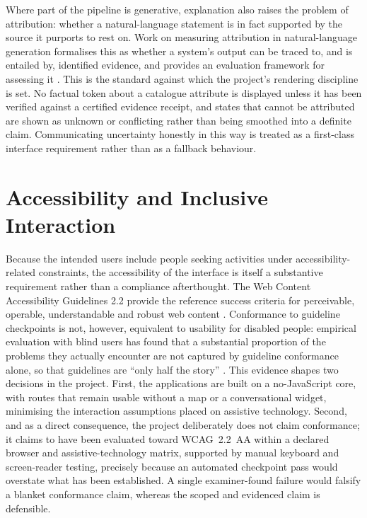 Where part of the pipeline is generative, explanation also raises the problem of attribution: whether
a natural-language statement is in fact supported by the source it purports to rest on. Work on
measuring attribution in natural-language generation formalises this as whether a system's output can
be traced to, and is entailed by, identified evidence, and provides an evaluation framework for
assessing it \cite{rashkin2023attribution}. This is the standard against which the project's rendering
discipline is set. No factual token about a catalogue attribute is displayed unless it has been
verified against a certified evidence receipt, and states that cannot be attributed are shown as
unknown or conflicting rather than being smoothed into a definite claim. Communicating uncertainty
honestly in this way is treated as a first-class interface requirement rather than as a fallback
behaviour.

\section{Accessibility and Inclusive Interaction}
\label{sec:accessibility}
Because the intended users include people seeking activities under accessibility-related constraints,
the accessibility of the interface is itself a substantive requirement rather than a compliance
afterthought. The Web Content Accessibility Guidelines 2.2 provide the reference success criteria for
perceivable, operable, understandable and robust web content \cite{w3c2023wcag22}. Conformance to
guideline checkpoints is not, however, equivalent to usability for disabled people: empirical
evaluation with blind users has found that a substantial proportion of the problems they actually
encounter are not captured by guideline conformance alone, so that guidelines are ``only half the
story'' \cite{power2012guidelines}. This evidence shapes two decisions in the project. First, the
applications are built on a no-JavaScript core, with routes that remain usable without a map or a
conversational widget, minimising the interaction assumptions placed on assistive technology. Second,
and as a direct consequence, the project deliberately does not claim conformance; it claims to have
been evaluated toward WCAG~2.2~AA within a declared browser and assistive-technology matrix, supported
by manual keyboard and screen-reader testing, precisely because an automated checkpoint pass would
overstate what has been established. A single examiner-found failure would falsify a blanket
conformance claim, whereas the scoped and evidenced claim is defensible.

